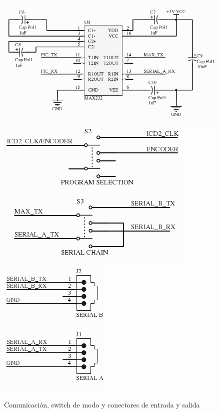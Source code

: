\documentclass[a4paper,10pt]{article}
\begin{document}
\begin{figure}
\centering
\includegraphics[scale=.28]{schemaComm1.png}
\includegraphics[scale=.28]{schemaComm2.png}
\includegraphics[scale=.28]{schemaComm3.png}
\caption{Comunicaci\'on, switch de modo y conectores de entrada y salida}
\label{schema2}
\end{figure}
\end{document}
